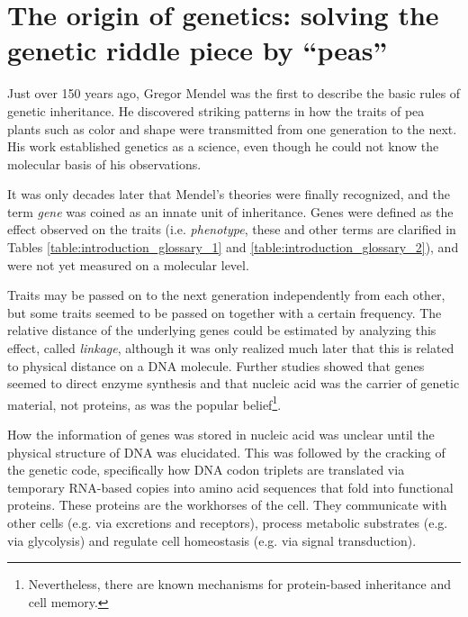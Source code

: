 \section[The origin of genetics]{The origin of genetics: solving the genetic riddle piece by “peas”} \label{intro_origin}

Just over 150 years ago, Gregor Mendel was the first to describe the basic rules of genetic inheritance\cite{Mendel_1866}.
He discovered striking patterns in how the traits of pea plants such as color and shape were transmitted from one generation to the next.
His work established genetics as a science, even though he could not know the molecular basis of his observations.

It was only decades later that Mendel’s theories were finally recognized, and the term \textsl{gene} was coined\cite{Johannsen_1909} as an innate unit of inheritance.
Genes were defined as the effect observed on the traits (i.e. \textsl{phenotype}, these and other terms are clarified in Tables \ref{table:introduction_glossary_1} and \ref{table:introduction_glossary_2}), and were not yet measured on a molecular level.

Traits may be passed on to the next generation independently from each other, but some traits seemed to be passed on together with a certain frequency.
The relative distance of the underlying genes could be estimated by analyzing this effect, called \textsl{linkage}\cite{Morgan_1915}, although it was only realized much later that this is related to physical distance on a DNA molecule.
Further studies showed that genes seemed to direct en\-zyme syn\-the\-sis\cite{Beadle_1941} and that nucleic acid was the carrier of genetic material\cite{Avery_1944,Hershey_1952}, not proteins, as was the popular belief\footnote{Nevertheless, there are known mechanisms for protein-based inheritance\cite{Prusiner_1998,Chakrabortee_2016} and cell memory\cite{Caudron_2013}.}.

How the information of genes was stored in nucleic acid was unclear until the physical structure of DNA was elucidated\cite{Watson_1953}.
This was followed by the cracking of the genetic code\cite{Leder_1964}, specifically how DNA codon triplets are translated via temporary RNA-based copies into amino acid sequences that fold into functional proteins.
These proteins are the workhorses of the cell. They communicate with other cells (e.g. via excretions and receptors), process metabolic substrates (e.g. via glycolysis) and regulate cell homeostasis (e.g. via signal transduction).

